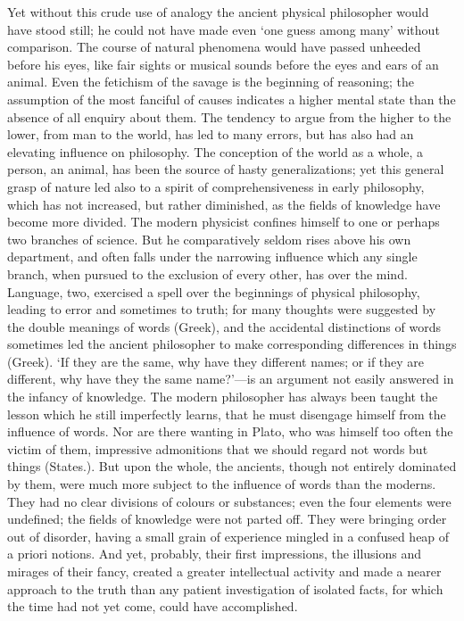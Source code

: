 Yet without this crude use of analogy the ancient physical philosopher
would have stood still; he could not have made even ‘one guess among many’
without comparison. The course of natural phenomena would have passed
unheeded before his eyes, like fair sights or musical sounds before the
eyes and ears of an animal. Even the fetichism of the savage is the
beginning of reasoning; the assumption of the most fanciful of causes
indicates a higher mental state than the absence of all enquiry about
them. The tendency to argue from the higher to the lower, from man to the
world, has led to many errors, but has also had an elevating influence on
philosophy. The conception of the world as a whole, a person, an animal,
has been the source of hasty generalizations; yet this general grasp of
nature led also to a spirit of comprehensiveness in early philosophy,
which has not increased, but rather diminished, as the fields of knowledge
have become more divided. The modern physicist confines himself to one or
perhaps two branches of science. But he comparatively seldom rises above
his own department, and often falls under the narrowing influence which
any single branch, when pursued to the exclusion of every other, has over
the mind. Language, two, exercised a spell over the beginnings of physical
philosophy, leading to error and sometimes to truth; for many thoughts
were suggested by the double meanings of words (Greek), and the accidental
distinctions of words sometimes led the ancient philosopher to make
corresponding differences in things (Greek). ‘If they are the same, why
have they different names; or if they are different, why have they the
same name?’—is an argument not easily answered in the infancy of
knowledge. The modern philosopher has always been taught the lesson which
he still imperfectly learns, that he must disengage himself from the
influence of words. Nor are there wanting in Plato, who was himself too
often the victim of them, impressive admonitions that we should regard not
words but things (States.). But upon the whole, the ancients, though not
entirely dominated by them, were much more subject to the influence of
words than the moderns. They had no clear divisions of colours or
substances; even the four elements were undefined; the fields of knowledge
were not parted off. They were bringing order out of disorder, having a
small grain of experience mingled in a confused heap of a priori notions.
And yet, probably, their first impressions, the illusions and mirages of
their fancy, created a greater intellectual activity and made a nearer
approach to the truth than any patient investigation of isolated facts,
for which the time had not yet come, could have accomplished.


